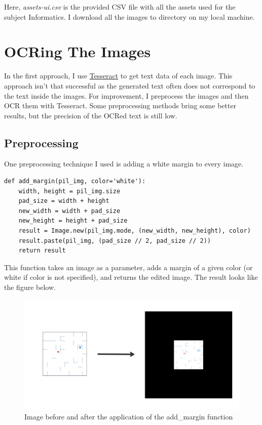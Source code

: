 \documentclass[
  digital,     %
  oneside,     %
  nosansbold,  %
  nocolorbold, %
  nolof,         %
  nolot,         %
]{fithesis4}
\begin{document}
Here, \emph{assets-ui.csv} is the provided CSV file with all the assets used for the subject Informatics. I download all the images to directory \emph{} on my local machine.

\section{OCRing The Images}

In the first approach, I use \hyperref[chap:ocr-tesseract]{Tesseract} to get text data of each image. This approach isn't that successful as the generated text often does not correspond to the text inside the images. For improvement, I preprocess the images and then OCR them with Tesseract. Some preprocessing methods bring some better results, but the precision of the OCRed text is still low.

\subsection{Preprocessing}

One preprocessing technique I used is adding a white margin to every image.

\begin{verbatim}
def add_margin(pil_img, color='white'):
    width, height = pil_img.size
    pad_size = width + height
    new_width = width + pad_size
    new_height = height + pad_size
    result = Image.new(pil_img.mode, (new_width, new_height), color)
    result.paste(pil_img, (pad_size // 2, pad_size // 2))
    return result
\end{verbatim}

This function takes an image as a parameter, adds a margin of a given color (or white if color is not specified), and returns the edited image. The result looks like the figure below.

\begin{figure}[h]
\caption{Image before and after the application of the add\_margin function}
\includegraphics[width=\textwidth]{images/add-margin.jpeg}
\centering
\end{figure}
\end{document}
